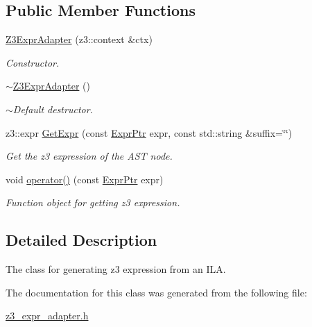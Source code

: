 \subsection*{Public Member Functions}
\begin{DoxyCompactItemize}
\item 
\mbox{\label{classilang_1_1_z3_expr_adapter_a1cd84d64c736b74025c51293b5f14a5a}} 
\mbox{\hyperlink{classilang_1_1_z3_expr_adapter_a1cd84d64c736b74025c51293b5f14a5a}{Z3\+Expr\+Adapter}} (z3\+::context \&ctx)
\begin{DoxyCompactList}\small\item\em Constructor. \end{DoxyCompactList}\item 
\mbox{\label{classilang_1_1_z3_expr_adapter_a61db9bcebad1599b4fe125f25c5e7301}} 
\mbox{\hyperlink{classilang_1_1_z3_expr_adapter_a61db9bcebad1599b4fe125f25c5e7301}{$\sim$\+Z3\+Expr\+Adapter}} ()
\begin{DoxyCompactList}\small\item\em $\sim$\+Default destructor. \end{DoxyCompactList}\item 
\mbox{\label{classilang_1_1_z3_expr_adapter_ae0cacd20a3ebd51b1e16480508d44162}} 
z3\+::expr \mbox{\hyperlink{classilang_1_1_z3_expr_adapter_ae0cacd20a3ebd51b1e16480508d44162}{Get\+Expr}} (const \mbox{\hyperlink{namespaceilang_a7c4196c72e53ea4df4b7861af7bc3bce}{Expr\+Ptr}} expr, const std\+::string \&suffix=\char`\"{}\char`\"{})
\begin{DoxyCompactList}\small\item\em Get the z3 expression of the A\+ST node. \end{DoxyCompactList}\item 
\mbox{\label{classilang_1_1_z3_expr_adapter_a71e0f6c8940b9b9b9ab66b60a6f90b8a}} 
void \mbox{\hyperlink{classilang_1_1_z3_expr_adapter_a71e0f6c8940b9b9b9ab66b60a6f90b8a}{operator()}} (const \mbox{\hyperlink{namespaceilang_a7c4196c72e53ea4df4b7861af7bc3bce}{Expr\+Ptr}} expr)
\begin{DoxyCompactList}\small\item\em Function object for getting z3 expression. \end{DoxyCompactList}\end{DoxyCompactItemize}


\subsection{Detailed Description}
The class for generating z3 expression from an I\+LA. 

The documentation for this class was generated from the following file\+:\begin{DoxyCompactItemize}
\item 
\mbox{\hyperlink{z3__expr__adapter_8h}{z3\+\_\+expr\+\_\+adapter.\+h}}\end{DoxyCompactItemize}
